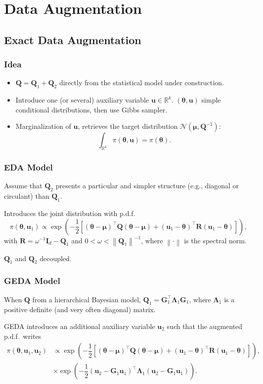 \documentclass[aspectratio=169]{beamer}
\newcommand{\B}[1]{\mathbf{#1}} %
\newcommand{\Bs}[1]{\boldsymbol{#1}} %
\newcommand{\pr}[1]{\left(#1\right)} %
\newcommand{\br}[1]{\left[#1\right]} %
\newcommand{\nr}[1]{\left\|#1\right\|} %
\begin{document}
\section{Data Augmentation}
\subsection{Exact Data Augmentation}
\begin{frame}
\frametitle{Idea}
\begin{itemize}
\item \(\B{Q} = \B{Q}_1 + \B{Q}_2\) directly from the statistical model under construction.
\item Introduce one (or several) auxiliary variable $\B{u} \in \mathbb{R}^k$. $(\Bs{\theta},\B{u})$ simple conditional distributions, then use Gibbs sampler.
\item Marginalization of $\B{u}$, retrieves the target distribution $\mathcal{N}(\Bs{\mu},\B{Q}^{-1})$: \[\int_{\mathbb{R}^k} \pi(\Bs{\theta},\B{u}) = \pi(\Bs{\theta}).\]
\end{itemize}
\end{frame}

\begin{frame}
\frametitle{EDA Model}
  Assume that $\B{Q}_2$ presents a particular and simpler structure (e.g., diagonal or circulant) than $\B{Q}_1$. 

  Introduces the joint distribution with p.d.f.
\[
    \pi(\Bs{\theta},\B{u}_1) \propto \exp\pr{-\dfrac{1}{2}\br{(\Bs{\theta}-\Bs{\mu})^{\top}\B{Q}(\Bs{\theta}-\Bs{\mu}) + (\B{u}_1-\Bs{\theta})^{\top}\B{R}(\B{u}_1-\Bs{\theta})}},
\]
  with $\B{R} = \omega^{-1}\B{I}_d - \B{Q}_1$ and $0< \omega < \nr{\B{Q}_1}^{-1}$, where $\nr{\cdot}$ is the spectral norm. 
  
$\B{Q}_1$ and $\B{Q}_2$ decoupled.
\end{frame}

\begin{frame}
  \frametitle{GEDA Model}
When $\B{Q}$ from a hierarchical Bayesian model, $\B{Q}_1 = \B{G}_1^{\top}\Bs{\Lambda}_1\B{G}_1$, where $\Bs{\Lambda}_1$ is a positive definite (and very often diagonal) matrix.
  
GEDA introduces an additional auxiliary variable $\B{u}_2$ such that the augmented p.d.f.\ writes
\[
  \begin{aligned}
    \pi(\Bs{\theta},\B{u}_1,\B{u}_2) &\propto \exp\pr{-\dfrac{1}{2}\br{(\Bs{\theta}-\Bs{\mu})^{\top}\B{Q}(\Bs{\theta}-\Bs{\mu}) + (\B{u}_1-\Bs{\theta})^{\top}\B{R}(\B{u}_1-\Bs{\theta})}}, \\
    &\times \exp\pr{-\dfrac{1}{2}(\B{u}_2-\B{G}_1\B{u}_1)^{\top}\B{\Lambda}_1(\B{u}_2-\B{G}_1\B{u}_1)}.
  \end{aligned}
\]
\end{frame}
\end{document}
